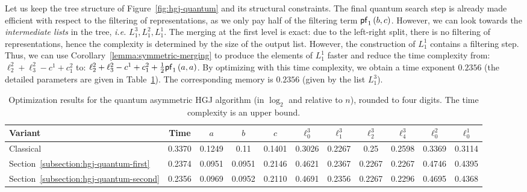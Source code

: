 Let us keep the tree structure of Figure~\ref{fig:hgj-quantum} and its structural constraints. The final quantum search step is already made efficient with respect to the filtering of representations, as we only pay half of the filtering term $\mathsf{pf}_1 \left(b, c \right)$. However, we can look towards the \emph{intermediate lists} in the tree, \emph{i.e.} $L_1^3, L_1^2, L_1^1$. The merging at the first level is exact: due to the left-right split, there is no filtering of representations, hence the complexity is determined by the size of the output list. However, the construction of $L_1^1$ contains a filtering step. Thus, we can use Corollary~\ref{lemma:symmetric-merging} to produce the elements of $L_1^1$ faster and reduce the time complexity from: $\ell_2^2 + \ell_3^2 - c^1 + c_1^2$ to: $\ell_2^2 + \ell_3^2 - c^1 + c_1^2 + \frac{1}{2} \mathsf{pf}_1 \left(a, a \right)$. By optimizing with this time complexity, we obtain a time exponent $0.2356$ (the detailed parameters are given in Table~\ref{table:quantum-hgj-parameters}). The corresponding memory is $0.2356$ (given by the list $L_1^3$).



\begin{table}
\centering
\small
\caption{Optimization results for the quantum asymmetric HGJ algorithm (in $\log_2$ and relative to $n$), rounded to four digits. The time complexity is an upper bound.}
\label{table:quantum-hgj-parameters}

\begin{tabular}{lcccccccccc}
\toprule
Variant &									  Time   & $a$    & $b$    & $c$    & $\ell^3_0$ & $\ell^3_1$ & $\ell^3_2$ & $\ell^3_4$ & $\ell^2_0$ & $\ell^1_0$ \\
\midrule
Classical 									& 0.3370 & 0.1249 & 0.11   & 0.1401 & 0.3026    &  0.2267 & 0.25   & 0.2598 & 0.3369 & 0.3114 \\
Section~\ref{subsection:hgj-quantum-first}  & 0.2374 & 0.0951 & 0.0951 & 0.2146 & 0.4621    &  0.2367 & 0.2267 & 0.2267 & 0.4746 & 0.4395 \\
Section~\ref{subsection:hgj-quantum-second} & 0.2356 & 0.0969 & 0.0952 & 0.2110 & 0.4691    &  0.2356 & 0.2267 & 0.2296 & 0.4695 & 0.4368 \\
\bottomrule
\end{tabular}

\end{table}




